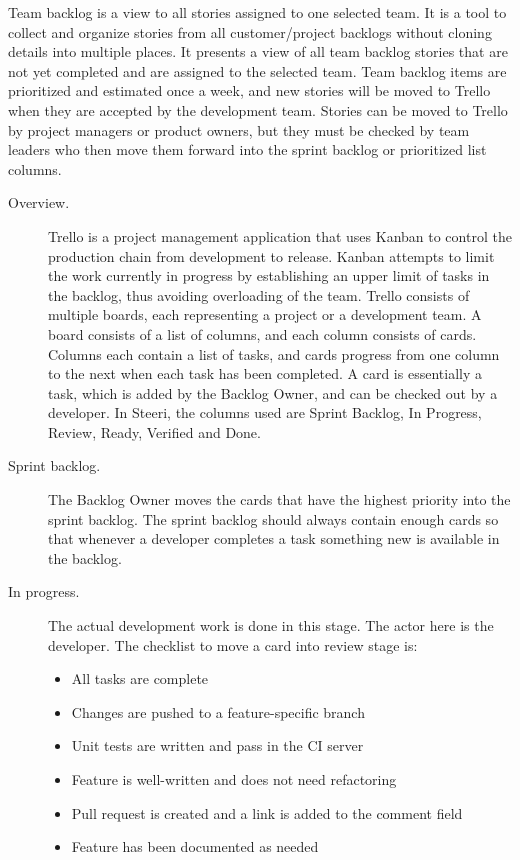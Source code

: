 \documentclass[english, grading]{tktltiki2}
\theoremstyle{definition}
\theoremstyle{remark}
\begin{document}
Team backlog is a view to all stories assigned to one selected team. It is a tool to collect and organize stories from all customer/project backlogs without cloning details into multiple places. It presents a view of all team backlog stories that are not yet completed and are assigned to the selected team. Team backlog items are prioritized and estimated once a week, and new stories will be moved to Trello when they are accepted by the development team. Stories can be moved to Trello by project managers or product owners, but they must be checked by team leaders who then move them forward into the sprint backlog or prioritized list columns.

\begin{description}
\item[Overview.] Trello is a project management application that uses Kanban to control the production chain from development to release. Kanban attempts to limit the work currently in progress by establishing an upper limit of tasks in the backlog, thus avoiding overloading of the team. Trello consists of multiple boards, each representing a project or a development team. A board consists of a list of columns, and each column consists of cards. Columns each contain a list of tasks, and cards progress from one column to the next when each task has been completed. A card is essentially a task, which is added by the Backlog Owner, and can be checked out by a developer. In Steeri, the columns used are Sprint Backlog, In Progress, Review, Ready, Verified and Done. 
\item[Sprint backlog.] The Backlog Owner moves the cards that have the highest priority into the sprint backlog. The sprint backlog should always contain enough cards so that whenever a developer completes a task something new is available in the backlog.
\item[In progress.] The actual development work is done in this stage. The actor here is the developer. The checklist to move a card into review stage is:
\begin{itemize}
	\item  All tasks are complete
	\item  Changes are pushed to a feature-specific branch
	\item  Unit tests are written and pass in the CI server
	\item  Feature is well-written and does not need refactoring
	\item  Pull request is created and a link is added to the comment field
	\item  Feature has been documented as needed

\end{itemize}
\end{description}
\end{document}
